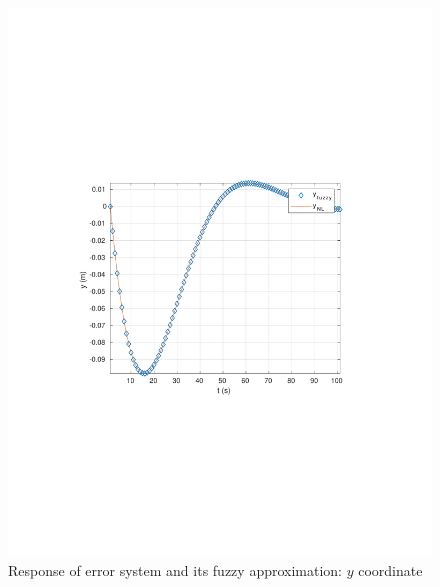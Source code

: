 \begin{frame}
	\begin{figure}[!htb]
		\centering
		\includegraphics[scale=0.7,trim={3.5cm 8cm 4cm 8cm},clip]{figuras/OL/y.pdf}
		\caption{Response of error system and its fuzzy approximation: $y$ coordinate} \label{fig:OL_y}
	\end{figure} 
\end{frame}
